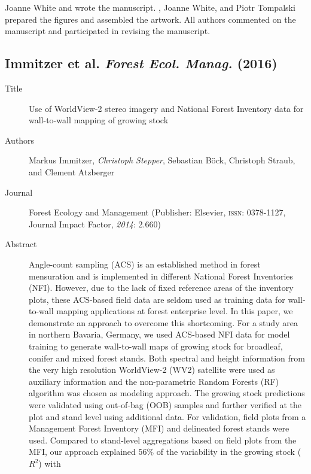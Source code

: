 \begin{description}
		Joanne White and \myName wrote the manuscript. \myName, Joanne White, and Piotr Tompalski prepared the figures and assembled the artwork.
		All authors commented on the manuscript and participated in revising the manuscript.
	
\end{description}



\subsection[Immitzer et al. \emph{Forest Ecol. Manag.} (2016)]
{Immitzer et al.\; 
	\emph{Forest Ecol. Manag.}
	(2016) }
\label{sec:pub.Forecol2016}

\begin{description}
	\item[Title] Use of WorldView-2 stereo imagery and National Forest Inventory data for wall-to-wall mapping of growing stock
	\item[Authors] Markus Immitzer, \emph{Christoph Stepper}, Sebastian Böck, Christoph Straub, and Clement Atzberger
	\item[Journal] Forest Ecology and Management (Publisher: Elsevier, \textsc{issn}: 0378-1127, 
		Journal Impact Factor, \emph{2014}: 2.660)
	\item[Abstract] Angle-count sampling (ACS) is an established method in forest mensuration and is implemented in different
		National Forest Inventories (NFI). However, due to the lack of fixed reference areas of the inventory
		plots, these ACS-based field data are seldom used as training data for wall-to-wall mapping applications
		at forest enterprise level. In this paper, we demonstrate an approach to overcome this shortcoming. For a
		study area in northern Bavaria, Germany, we used ACS-based NFI data for model training to generate
		wall-to-wall maps of growing stock for broadleaf, conifer and mixed forest stands. Both spectral and
		height information from the very high resolution World\mbox{View-2} (WV2) satellite were used as auxiliary
		information and the non-parametric Random Forests (RF) algorithm was chosen as modeling approach.
		The growing stock predictions were validated using out-of-bag (OOB) samples and further verified at
		the plot and stand level using additional data. For validation, field plots from a Management Forest
		Inventory (MFI) and delineated forest stands were used. Compared to stand-level aggregations based
		on field plots from the MFI, our approach explained $56\%$ of the variability in the growing stock ($R^2$) with

\end{description}
